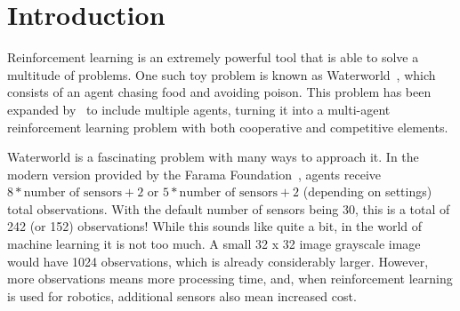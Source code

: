 \section{Introduction}\label{sec:introduction}
Reinforcement learning is an extremely powerful tool that is able to solve a multitude
of problems.
One such toy problem is known as Waterworld~\cite{Karpathy2015, Ho2016}, which consists
of an agent chasing food and avoiding poison.
This problem has been expanded by~\cite{Gupta2017} to include multiple agents,
turning it into a multi-agent reinforcement learning problem with both cooperative
and competitive elements.

Waterworld is a fascinating problem with many ways to approach it.
In the modern version provided by the Farama Foundation~\cite{WaterworldDocumentation},
agents receive $8 * \text{number of sensors} + 2$ or
$5 * \text{number of sensors} + 2$ (depending on settings) total observations.
With the default number of sensors being 30, this is a total of 242 (or 152)
observations!
While this sounds like quite a bit, in the world of machine learning it is not too
much.
A small 32 x 32 image grayscale image would have 1024 observations, which is already
considerably larger.
However, more observations means more processing time, and, when reinforcement
learning is used for robotics, additional sensors also mean increased cost.
